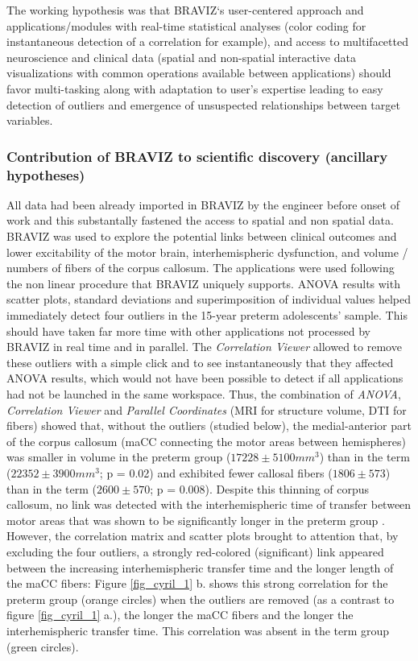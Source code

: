 \documentclass{frontiersHLTH}
\begin{document}
The working hypothesis was that BRAVIZ‘s user-centered approach and applications/modules with real-time statistical analyses (color coding for instantaneous detection of a correlation for example), and access to multifacetted neuroscience and clinical data (spatial and non-spatial interactive data visualizations with common operations available between applications) should favor multi-tasking along with adaptation to user's expertise leading to easy detection of outliers and emergence of unsuspected relationships between target variables.


\subsubsection{Contribution of BRAVIZ to scientific discovery (ancillary hypotheses)}

All data had been already imported in BRAVIZ by the engineer before onset of work and this substantally fastened the access to spatial and non spatial data. BRAVIZ was used to explore the potential links between clinical outcomes and lower excitability of the motor brain, interhemispheric dysfunction, and volume / numbers of fibers of the corpus callosum. The applications were used following the non linear procedure that BRAVIZ uniquely supports. ANOVA results with scatter plots, standard deviations and superimposition of individual values helped immediately detect four outliers in the 15-year preterm adolescents’ sample. This should have taken far more time with other applications not processed by BRAVIZ in real time and in parallel. The \emph{Correlation Viewer} allowed to remove these outliers with a simple click and to see instantaneously that they affected ANOVA results, which would not have been possible to detect if all applications had not be launched in the same workspace. Thus, the combination of \emph{ANOVA}, \emph{Correlation Viewer} and \emph{Parallel Coordinates} (MRI for structure volume, DTI for fibers) showed that,  without the outliers (studied below), the medial-anterior part of the corpus callosum (maCC connecting the motor areas between hemispheres) was smaller in volume in the preterm group ($17228 \pm 5100 mm^3$) than in the term ($22352 \pm 3900mm^3$; p = 0.02) and exhibited fewer callosal fibers ($1806 \pm 573$) than in the term ($2600 \pm 570$; p = 0.008). Despite this thinning of corpus callosum, no link was detected with the interhemispheric time of transfer between motor areas that was shown to be significantly longer in the preterm group \cite{schneider_cerebral_2012}. However, the correlation matrix and scatter plots brought to attention that, by excluding the four outliers, a strongly red-colored (significant) link appeared between  the increasing interhemispheric transfer time and the longer length of the maCC fibers: Figure \ref{fig_cyril_1} b. shows this strong correlation for the preterm group (orange circles) when the outliers are removed (as a contrast to figure \ref{fig_cyril_1} a.), the longer the maCC fibers and the longer the interhemispheric transfer time. This correlation was absent in the term group (green circles). 
\end{document}
